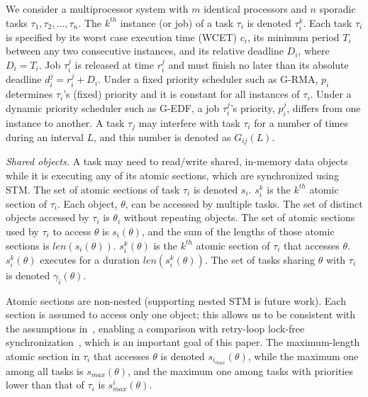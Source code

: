 \documentclass[letter]{sig-alternate}
\begin{document}
We consider a multiprocessor system with $m$ identical processors and $n$ sporadic tasks $\tau_1, \tau_2,\ldots, \tau_n$. The $k^{th}$ instance (or job) of a task $\tau_i$ is denoted $\tau_i^k$. Each task $\tau_i$ is specified by its worst case execution time (WCET) $c_i$, its minimum period $T_i$ between any two consecutive instances, and its relative deadline $D_i$, where $D_i=T_i$. Job $\tau_i^j$ is released at time $r_i^j$ and must finish no later than its absolute deadline $d_i^j=r_i^j+D_i$. Under a fixed priority scheduler such as G-RMA, $p_i$ determines $\tau_i$'s (fixed) priority and it is constant for all instances of $\tau_i$. Under a dynamic priority scheduler such as G-EDF, a job $\tau_i^j$'s priority, $p_i^j$, differs from one instance to another. 
A task $\tau_j$ may interfere with task $\tau_i$ for a number of times during an interval $L$, and this number is denoted as $G_{ij}(L)$. 


\textit{Shared objects.}
 A task may need to read/write shared, in-memory data objects while it is executing any of its atomic sections, which are synchronized using STM. 
The set of atomic sections of task $\tau_i$ is denoted $s_i$. $s_i^k$ is the $k^{th}$ atomic section of $\tau_i$. 
Each object, $\theta$, can be accessed by multiple tasks. The set of distinct objects accessed by $\tau_i$ is $\theta_i$ without repeating objects.
The set of atomic sections used by $\tau_i$ to access $\theta$ is $s_i(\theta)$, and the sum of the lengths of those atomic sections is $len(s_i(\theta))$. $s_i^k(\theta)$ is the $k^{th}$ atomic section of $\tau_i$ that accesses $\theta$. $s_i^k(\theta)$  executes for a duration $len(s_i^k(\theta))$.
The set of tasks sharing $\theta$ with $\tau_i$ is denoted $\gamma_i(\theta)$. 

Atomic sections are non-nested (supporting nested STM is future work). Each section is assumed to access only one object; this allows us to be consistent with the assumptions in~\cite{stmconcurrencycontrol:emsoft11}, enabling a comparison with retry-loop lock-free synchronization~\cite{key-5}, which is an important goal of this paper.
The maximum-length atomic section in $\tau_i$ that accesses $\theta$ is denoted $s_{i_{max}} (\theta)$, while the maximum one among all tasks is $s_{max} (\theta)$, and the maximum one among tasks with priorities lower than that of $\tau_i$ is $s_{max}^i (\theta)$.
\end{document}
